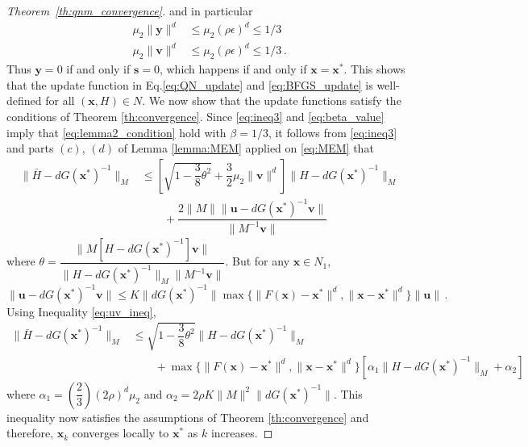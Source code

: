 \documentclass{statsoc}
\newcommand{\bs}{\boldsymbol{s}}
\newcommand{\bu}{\boldsymbol{u}}
\newcommand{\bv}{\boldsymbol{v}}
\newcommand{\bx}{\boldsymbol{x}}
\newcommand{\by}{\boldsymbol{y}}
\begin{document}
\begin{proof}[Theorem~\ref{th:qnm_convergence}]
and in particular
\begin{subequations}
\begin{align}
    \mu_2 \|\by\|^d &\leq \mu_2 (\rho \epsilon)^d \leq 1/3\\
    \mu_2 \|\bv\|^d &\leq \mu_2 (\rho \epsilon)^d \leq 1/3\,. \label{eq:beta_value}
\end{align}
\end{subequations}
Thus $\by=0$ if and only if $\bs=0$, which happens if and only if $\bx=\bx^\ast$. This shows that the update function in Eq.\eqref{eq:QN_update} and \eqref{eq:BFGS_update} is well-defined for all $(\bx,H) \in N$. We now show that the update functions satisfy the conditions of Theorem \ref{th:convergence}. Since \eqref{eq:ineq3} and \eqref{eq:beta_value} imply that \eqref{eq:lemma2_condition} hold with $\beta = 1/3$, it follows from \eqref{eq:ineq3} and parts $(c)$, $(d)$ of Lemma \ref{lemma:MEM} applied on \eqref{eq:MEM} that
\begin{align*}
    \|\bar{H} - dG(\bx^\ast)^{-1}\|_M &\leq \left[\sqrt{1 - \dfrac{3}{8}\theta^2} + \dfrac{3}{2}\mu_2\|\bv\|^d\right]\|H - dG(\bx^\ast)^{-1}\|_M\\
    &\qquad + \dfrac{2\|M\| \|\bu - dG(\bx^\ast)^{-1}\bv\|}{\|M^{-1}\bv\|}
\end{align*}
where $\theta = \dfrac{\|M[H - dG(\bx^\ast)^{-1}]\bv\|}{\|H- dG(\bx^\ast)^{-1}\|_M\|M^{-1}\bv\|}$.
But for any $\bx\in N_1$,
\[
\|\bu - dG(\bx^\ast)^{-1}\bv\| \leq K\|dG(\bx^\ast)^{-1}\|\max\{\|F(\bx) - \bx^\ast\|^d, \|\bx-\bx^\ast\|^d\}\|\bu\|\,.
\]
Using Inequality \eqref{eq:uv_ineq},
\begin{align} \label{eq:H_ineq}
    \|\bar{H} - dG(\bx^\ast)^{-1}\|_M &\leq \sqrt{1 - \dfrac{3}{8}\theta^2}\|H - dG(\bx^\ast)^{-1}\|_M \nonumber \\
    & \qquad + \max\{\|F(\bx) - \bx^\ast\|^d, \|\bx-\bx^\ast\|^d\}[\alpha_1\|H - dG(\bx^\ast)^{-1}\|_M + \alpha_2]
\end{align}
where $\alpha_1 = \left(\dfrac{2}{3}\right)(2 \rho)^d \mu_2$ and $\alpha_2 = 2 \rho K \|M\|^2 \|dG(\bx^\ast)^{-1}\|$. This inequality now satisfies the assumptions of Theorem \ref{th:convergence} and therefore, $\bx_k$ converges locally to $\bx^\ast$ as $k$ increases.


\end{proof}
\end{document}
